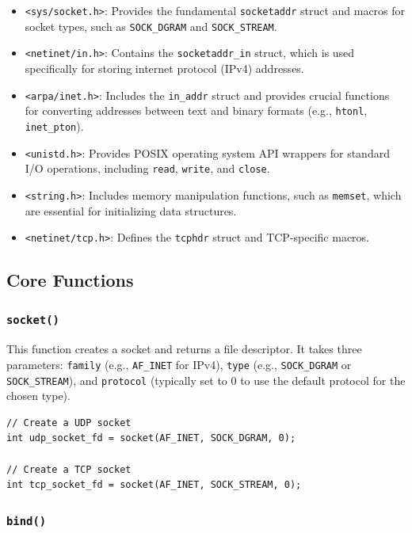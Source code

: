 \documentclass{article}
\begin{document}
\begin{itemize}
    \item \texttt{<sys/socket.h>}: Provides the fundamental \texttt{socketaddr} struct and macros for socket types, such as \texttt{SOCK\_DGRAM} and \texttt{SOCK\_STREAM}.
    \item \texttt{<netinet/in.h>}: Contains the \texttt{socketaddr\_in} struct, which is used specifically for storing internet protocol (IPv4) addresses.
    \item \texttt{<arpa/inet.h>}: Includes the \texttt{in\_addr} struct and provides crucial functions for converting addresses between text and binary formats (e.g., \texttt{htonl}, \texttt{inet\_pton}).
    \item \texttt{<unistd.h>}: Provides POSIX operating system API wrappers for standard I/O operations, including \texttt{read}, \texttt{write}, and \texttt{close}.
    \item \texttt{<string.h>}: Includes memory manipulation functions, such as \texttt{memset}, which are essential for initializing data structures.
    \item \texttt{<netinet/tcp.h>}: Defines the \texttt{tcphdr} struct and TCP-specific macros.
\end{itemize}

\subsection{Core Functions}

\subsubsection[socket() function]{\texttt{socket()}}

This function creates a socket and returns a file descriptor. It takes three parameters: \texttt{family} (e.g., \texttt{AF\_INET} for IPv4), \texttt{type} (e.g., \texttt{SOCK\_DGRAM} or \texttt{SOCK\_STREAM}), and \texttt{protocol} (typically set to $0$ to use the default protocol for the chosen type).

\begin{verbatim}
// Create a UDP socket
int udp_socket_fd = socket(AF_INET, SOCK_DGRAM, 0);

// Create a TCP socket
int tcp_socket_fd = socket(AF_INET, SOCK_STREAM, 0);
\end{verbatim}

\subsubsection[bind() function]{\texttt{bind()}}
\end{document}
